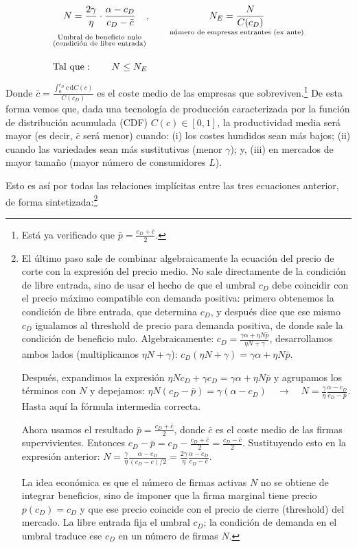 \documentclass[10pt,a4paper]{article}
\begin{document}
$$\begin{aligned}
    &\underset{\substack{\\[0.5em]\text{\scriptsize Umbral de beneficio nulo}\\\text{\scriptsize (condición de libre entrada)}}}{N = \frac{2\gamma}{\eta} \cdot \frac{\alpha - c_D}{c_D-\bar{c}}},\qquad \underset{\text{\scriptsize número de empresas entrantes (ex ante)}}{N_E = \frac{N}{C(c_D)}}\\[1em]
    &\text{Tal que}:\qquad N\leq N_E
\end{aligned}$$

Donde $\bar{c} =\frac{\int_0^{c_D}c\, \mathrm dC(c)}{C(c_D)}$ es el coste medio de las empresas que sobreviven.\footnote{Está ya verificado que $\bar p=\frac{c_D+\bar c}{2}$.
} De esta forma vemos que, dada una tecnología de producción caracterizada por la función de distribución acumulada (CDF) $C(c)\in[0,1]$, la productividad media será mayor (es decir, $\bar{c}$ será menor) cuando: (i) los costes hundidos sean más bajos; (ii) cuando las variedades sean más sustitutivas (menor $\gamma$); y, (iii) en mercados de mayor tamaño (mayor número de consumidores $L$). 

Esto es así por todas las relaciones implícitas entre las tres ecuaciones anterior, de forma sintetizada:\footnote{%
    El último paso sale de combinar algebraicamente la ecuación del precio de corte con la expresión del precio medio. No sale directamente de la condición de libre entrada, sino de usar el hecho de que el umbral $c_D$ debe coincidir con el precio máximo compatible con demanda positiva: primero obtenemos la condición de libre entrada, que determina $c_D$, y después dice que ese mismo $c_D$ igualamos al threshold de precio para demanda positiva, de donde sale la condición de beneficio nulo. Algebraicamente: $c_D=\frac{\gamma \alpha+\eta N\bar p}{\eta N+\gamma}$, desarrollamos ambos lados (multiplicamos $\eta N+\gamma$): $c_D(\eta N+\gamma)=\gamma\alpha+\eta N\bar p$.

Después, expandimos la expresión $\eta N c_D+\gamma c_D=\gamma\alpha+\eta N\bar p$ y agrupamos los términos con $N$ y depejamos: $\eta N(c_D-\bar p)=\gamma(\alpha-c_D)\quad\to\quad N=\frac{\gamma}{\eta}\frac{\alpha-c_D}{c_D-\bar p}$. Hasta aquí la fórmula intermedia correcta. 

Ahora usamos el resultado $\bar p=\frac{c_D+\bar c}{2}$, donde $\bar c$ es el coste medio de las firmas supervivientes. Entonces $c_D-\bar p=c_D-\frac{c_D+\bar c}{2}=\frac{c_D-\bar c}{2}$. Sustituyendo esto en la expresión anterior: $N=\frac{\gamma}{\eta}\frac{\alpha-c_D}{(c_D-\bar c)/2}=\frac{2\gamma}{\eta}\frac{\alpha-c_D}{c_D-\bar c}.$

La idea económica es que el número de firmas activas $N$ no se obtiene de integrar beneficios, sino de imponer que la firma marginal tiene precio $p(c_D)=c_D$ y que ese precio coincide con el precio de cierre (threshold) del mercado. La libre entrada fija el umbral $c_D$; la condición de demanda en el umbral traduce ese $c_D$ en un número de firmas $N$.
}
\end{document}
